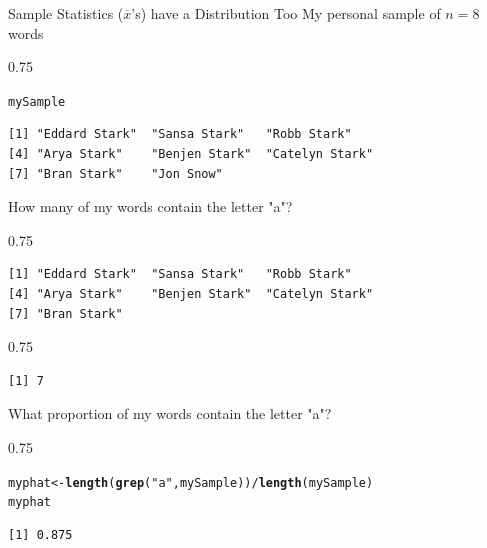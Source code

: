 \documentclass{beamer}\usepackage[]{graphicx}\usepackage[]{color}
\makeatletter
\newcommand{\hlstr}[1]{\textcolor[rgb]{0.2,0.2,0.2}{#1}}%
\newcommand{\hlopt}[1]{\textcolor[rgb]{0.102,0.102,0.102}{#1}}%
\newcommand{\hlstd}[1]{\textcolor[rgb]{0.102,0.102,0.102}{#1}}%
\newcommand{\hlkwb}[1]{\textcolor[rgb]{0.102,0.102,0.102}{#1}}%
\newcommand{\hlkwd}[1]{\textcolor[rgb]{0.102,0.102,0.102}{\textbf{#1}}}%
\newenvironment{kframe}{%
 \def\at@end@of@kframe{}%
 \ifinner\ifhmode%
  \def\at@end@of@kframe{\end{minipage}}%
  \begin{minipage}{\columnwidth}%
 \fi\fi%
 \def\FrameCommand##1{\hskip\@totalleftmargin \hskip-\fboxsep
 \colorbox{shadecolor}{##1}\hskip-\fboxsep
     \hskip-\linewidth \hskip-\@totalleftmargin \hskip\columnwidth}%
 \MakeFramed {\advance\hsize-\width
   \@totalleftmargin\z@ \linewidth\hsize
   \@setminipage}}%
 {\par\unskip\endMakeFramed%
 \at@end@of@kframe}
\newenvironment{knitrout}{}{} %
\renewenvironment{knitrout}{\begin{spacing}{0.75}\begin{tiny}}{\end{tiny}\end{spacing}}
\newcommand{\xbar}{\overline{x}}
\makeatother
\begin{document}
\begin{frame}{Sample Statistics ($\xbar$'s) have a Distribution Too\;\;}
My personal sample of $n=8$ words
\begin{knitrout}\small
{}\color{fgcolor}\begin{kframe}
\begin{alltt}
\hlstd{mySample}
\end{alltt}
\begin{verbatim}
[1] "Eddard Stark"  "Sansa Stark"   "Robb Stark"   
[4] "Arya Stark"    "Benjen Stark"  "Catelyn Stark"
[7] "Bran Stark"    "Jon Snow"     
\end{verbatim}
\end{kframe}
\end{knitrout}
How many of my words contain the letter "a"?
\begin{knitrout}\small
{}\color{fgcolor}\begin{kframe}
\begin{verbatim}
[1] "Eddard Stark"  "Sansa Stark"   "Robb Stark"   
[4] "Arya Stark"    "Benjen Stark"  "Catelyn Stark"
[7] "Bran Stark"   
\end{verbatim}
\end{kframe}
\end{knitrout}
\begin{knitrout}\small
{}\color{fgcolor}\begin{kframe}
\begin{verbatim}
[1] 7
\end{verbatim}
\end{kframe}
\end{knitrout}
What proportion of my words contain the letter "a"?
\begin{knitrout}\small
{}\color{fgcolor}\begin{kframe}
\begin{alltt}
\hlstd{myphat} \hlkwb{<-} \hlkwd{length}\hlstd{(}\hlkwd{grep}\hlstd{(}\hlstr{"a"}\hlstd{, mySample))} \hlopt{/} \hlkwd{length}\hlstd{(mySample)}
\hlstd{myphat}
\end{alltt}
\begin{verbatim}
[1] 0.875
\end{verbatim}
\end{kframe}
\end{knitrout}


\end{frame}
\end{document}
